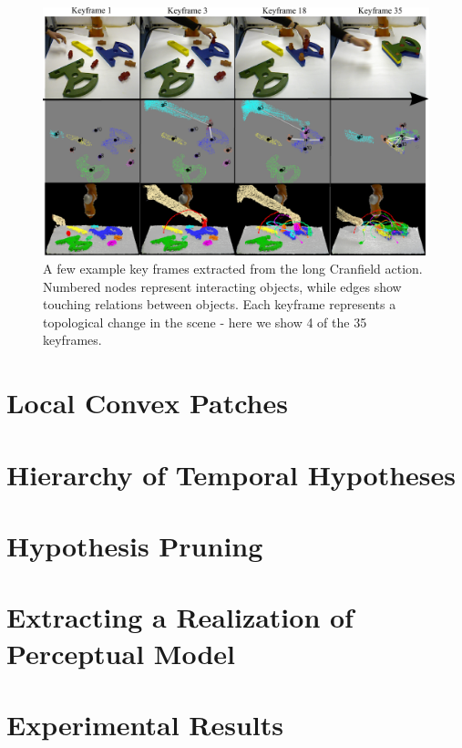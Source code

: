 \begin{figure}[ht!]
  \centering
  \includegraphics[width=\linewidth]{figures/IROS2013/SECKF.pdf}
  \caption[Cranfield Key Frames]{A few example key frames extracted from the long Cranfield action. Numbered nodes represent interacting objects, while edges show touching relations between objects. Each keyframe represents a topological change in the scene - here we show 4 of the 35 keyframes.}
  \label{fig:SECGraphs}
\end{figure}



\section{Local Convex Patches}
\section{Hierarchy of Temporal Hypotheses}
\section{Hypothesis Pruning}
\section{Extracting a Realization of Perceptual Model}
\section{Experimental Results}




